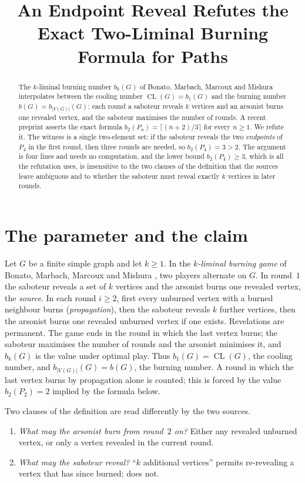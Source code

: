 \documentclass[11pt]{amsart}
\title[An endpoint reveal refutes an exact liminal burning formula]
{An Endpoint Reveal Refutes the Exact Two-Liminal Burning Formula for Paths}
\date{}
\theoremstyle{remark}
\newcommand{\CL}{\operatorname{CL}}
\begin{document}
\begin{abstract}
The $k$-liminal burning number $b_k(G)$ of Bonato, Marbach, Marcoux and Mishura
interpolates between the cooling number $\CL(G)=b_1(G)$ and the burning number
$b(G)=b_{|V(G)|}(G)$: each round a saboteur reveals $k$ vertices and an
arsonist burns one revealed vertex, and the saboteur maximises the number of
rounds. A recent preprint asserts the exact formula
$b_2(P_n)=\lceil (n+2)/3\rceil$ for every $n\ge1$. We refute it. The witness is
a single two-element set: if the saboteur reveals the two \emph{endpoints} of
$P_4$ in the first round, then three rounds are needed, so $b_2(P_4)=3>2$. The
argument is four lines and needs no computation, and the lower bound
$b_2(P_4)\ge3$, which is all the refutation uses, is insensitive to the two
clauses of the definition that the sources leave ambiguous and to whether the
saboteur must reveal exactly $k$ vertices in later rounds.
\end{abstract}

\maketitle

\section{The parameter and the claim}

Let $G$ be a finite simple graph and let $k\ge1$. In the \emph{$k$-liminal
burning game} of Bonato, Marbach, Marcoux and Mishura \cite{BMMM}, two players
alternate on $G$. In round~$1$ the saboteur reveals a set of $k$ vertices and
the arsonist burns one revealed vertex, the \emph{source}. In each round
$i\ge2$, first every unburned vertex with a burned neighbour burns
(\emph{propagation}), then the saboteur reveals $k$ further vertices, then the
arsonist burns one revealed unburned vertex if one exists. Revelations are
permanent. The game ends in the round in which the last vertex burns; the
saboteur maximises the number of rounds and the arsonist minimises it, and
$b_k(G)$ is the value under optimal play. Thus $b_1(G)=\CL(G)$, the cooling
number, and $b_{|V(G)|}(G)=b(G)$, the burning number. A round in which the last
vertex burns by propagation alone is counted; this is forced by the value
$b_2(P_2)=2$ implied by the formula below.

Two clauses of the definition are read differently by the two sources.

\begin{enumerate}
\item[(A)] \emph{What may the arsonist burn from round~$2$ on?} Either any
revealed unburned vertex, or only a vertex revealed in the current round.
\item[(S)] \emph{What may the saboteur reveal?} ``$k$ additional vertices''
\cite{Target} permits re-revealing a vertex that has since burned; \cite{BMMM}
does not.
\end{enumerate}
\end{document}
